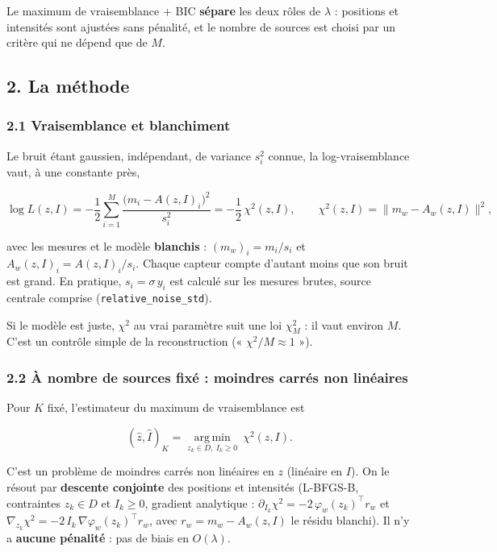 \documentclass[
  french,
]{article}
\begin{document}
Le maximum de vraisemblance + BIC \textbf{sépare} les deux rôles de
\(\lambda\) : positions et intensités sont ajustées sans pénalité, et le
nombre de sources est choisi par un critère qui ne dépend que de \(M\).

\subsection{2. La méthode}\label{la-muxe9thode}

\subsubsection{2.1 Vraisemblance et
blanchiment}\label{vraisemblance-et-blanchiment}

Le bruit étant gaussien, indépendant, de variance \(s_i^2\) connue, la
log-vraisemblance vaut, à une constante près,

\[
\log L(z, I) = -\frac12\sum_{i=1}^{M}\frac{\big(m_i - A(z, I)_i\big)^2}{s_i^2}
= -\frac12\,\chi^2(z, I),
\qquad
\chi^2(z, I) = \big\lVert m_w - A_w(z, I)\big\rVert^2 ,
\]

avec les mesures et le modèle \textbf{blanchis} : \((m_w)_i = m_i/s_i\)
et \(A_w(z, I)_i = A(z, I)_i/s_i\). Chaque capteur compte d'autant moins
que son bruit est grand. En pratique, \(s_i = \sigma\,y_i\) est calculé
sur les mesures brutes, source centrale comprise
(\texttt{relative\_noise\_std}).

Si le modèle est juste, \(\chi^2\) au vrai paramètre suit une loi
\(\chi^2_M\) : il vaut environ \(M\). C'est un contrôle simple de la
reconstruction (« \(\chi^2/M\approx 1\) »).

\subsubsection{2.2 À nombre de sources fixé : moindres carrés non
linéaires}\label{uxe0-nombre-de-sources-fixuxe9-moindres-carruxe9s-non-linuxe9aires}

Pour \(K\) fixé, l'estimateur du maximum de vraisemblance est

\[
(\hat z, \hat I)_K = \operatorname*{arg\,min}_{z_k\in D,\ I_k\ge 0}\ \chi^2(z, I) .
\]

C'est un problème de moindres carrés non linéaires en \(z\) (linéaire en
\(I\)). On le résout par \textbf{descente conjointe} des positions et
intensités (L-BFGS-B, contraintes \(z_k\in D\) et \(I_k\ge 0\), gradient
analytique : \(\partial_{I_k}\chi^2 = -2\,\varphi_w(z_k)^{\top} r_w\) et
\(\nabla_{z_k}\chi^2 = -2\,I_k\,\nabla\varphi_w(z_k)^{\top} r_w\), avec
\(r_w = m_w - A_w(z, I)\) le résidu blanchi). Il n'y a \textbf{aucune
pénalité} : pas de biais en \(O(\lambda)\).
\end{document}
